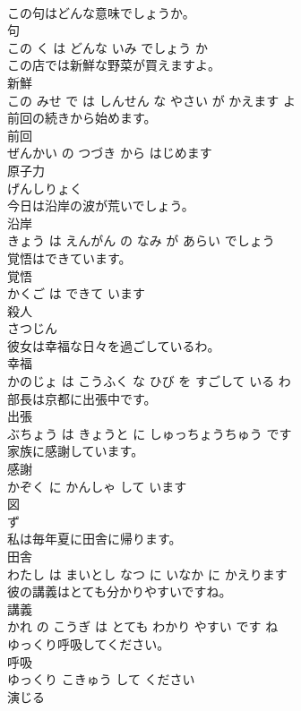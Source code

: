 \documentclass[8pt]{extreport}
\begin{document}
\begin{CJK}{UTF8}{min}
\\	この句はどんな意味でしょうか。	
\\	句 
\\	この く は どんな いみ でしょう か			
\\	この店では新鮮な野菜が買えますよ。	
\\	新鮮 
\\	この みせ で は しんせん な やさい が かえます よ			
\\	前回の続きから始めます。	
\\	前回 
\\	ぜんかい の つづき から はじめます			
\\	原子力	
\\	げんしりょく		
\\	今日は沿岸の波が荒いでしょう。	
\\	沿岸 
\\	きょう は えんがん の なみ が あらい でしょう			
\\	覚悟はできています。	
\\	覚悟 
\\	かくご は できて います			
\\	殺人	
\\	さつじん		
\\	彼女は幸福な日々を過ごしているわ。	
\\	幸福 
\\	かのじょ は こうふく な ひび を すごして いる わ			
\\	部長は京都に出張中です。	
\\	出張 
\\	ぶちょう は きょうと に しゅっちょうちゅう です			
\\	家族に感謝しています。	
\\	感謝 
\\	かぞく に かんしゃ して います			
\\	図	
\\	ず		
\\	私は毎年夏に田舎に帰ります。	
\\	田舎 
\\	わたし は まいとし なつ に いなか に かえります			
\\	彼の講義はとても分かりやすいですね。	
\\	講義 
\\	かれ の こうぎ は とても わかり やすい です ね			
\\	ゆっくり呼吸してください。	
\\	呼吸 
\\	ゆっくり こきゅう して ください			
\\	演じる	

\end{CJK}
\end{document}
